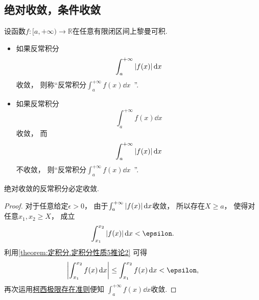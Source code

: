 \subsection{绝对收敛，条件收敛}
\begin{definition}
设函数\(f\colon[a,+\infty)\to\mathbb{R}\)在任意有限闭区间上黎曼可积.
\begin{itemize}
	\item 如果反常积分\begin{equation*}
		\int_a^{+\infty} \abs{f(x)} \dd{x}
	\end{equation*}收敛，
	则称“反常积分\(\int_a^{+\infty} f(x) \dd{x}\)~”.

	\item 如果反常积分\begin{equation*}
		\int_a^{+\infty} f(x) \dd{x}
	\end{equation*}收敛，
	而\begin{equation*}
		\int_a^{+\infty} \abs{f(x)} \dd{x}
	\end{equation*}不收敛，
	则“反常积分\(\int_a^{+\infty} f(x) \dd{x}\)~”.
\end{itemize}
\end{definition}

\begin{theorem}\label{theorem:定积分.绝对收敛的无穷限反常积分必收敛}
绝对收敛的反常积分必定收敛.
\begin{proof}
对于任意给定\(\epsilon>0\)，
由于\(\int_a^{+\infty} \abs{f(x)} \dd{x}\)收敛，
所以存在\(X \geq a\)，
使得对任意\(x_1,x_2 \geq X\)，
成立\begin{equation*}
	\int_{x_1}^{x_2} \abs{f(x)} \dd{x} < \epsilon.
\end{equation*}
利用\cref{theorem:定积分.定积分性质5推论2} 可得\begin{equation*}
	\abs{\int_{x_1}^{x_2} f(x) \dd{x}}
	\leq \int_{x_1}^{x_2} f(x) \dd{x}
	< \epsilon,
\end{equation*}
再次运用\hyperref[theorem:反常积分.柯西极限存在准则]{柯西极限存在准则}便知
\(\int_a^{+\infty} f(x) \dd{x}\)收敛.
\end{proof}
\end{theorem}

